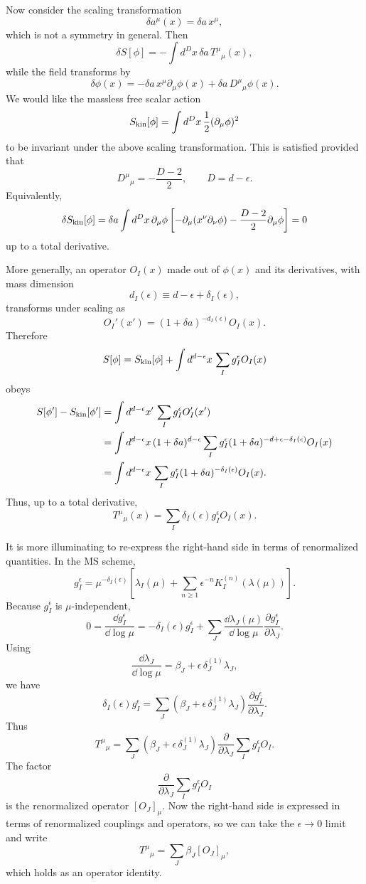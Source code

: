 Now consider the scaling transformation
\[
  \delta a^\mu(x)=\delta a\,x^\mu,
\]
which is not a symmetry in general.  Then
\[
  \delta S[\phi]
  =
  -\int d^Dx\,\delta a\,T^\mu{}_\mu(x),
\]
while the field transforms by
\[
  \delta\phi(x)
  =
  -\delta a\,x^\mu\partial_\mu\phi(x)
  +
  \delta a\,D^\mu{}_\mu\phi(x).
\]
We would like the massless free scalar action
\[
  S_{\rm kin}[\phi]=
  \int d^Dx\,\frac12(\partial_\mu\phi)^2
\]
to be invariant under the above scaling transformation.  This is satisfied
provided that
\[
  D^\mu{}_\mu=-\frac{D-2}{2},
  \qquad D=d-\epsilon.
\]
Equivalently,
\[
  \delta S_{\rm kin}[\phi]
  =
  \delta a\int d^Dx\,\partial_\mu\phi
  \left[
    -\partial_\mu(x^\nu\partial_\nu\phi)
    -\frac{D-2}{2}\partial_\mu\phi
  \right]
  =
  0
\]
up to a total derivative.

More generally, an operator \(O_I(x)\) made out of \(\phi(x)\) and its
derivatives, with mass dimension
\[
  d_I(\epsilon)\equiv d-\epsilon+\delta_I(\epsilon),
\]
transforms under scaling as
\[
  O_I'(x')
  =
  (1+\delta a)^{-d_I(\epsilon)}O_I(x).
\]
Therefore
\[
  S[\phi]
  =
  S_{\rm kin}[\phi]
  +
  \int d^{d-\epsilon}x\,
  \sum_I g_I^\epsilon O_I(x)
\]
obeys
\[
\begin{split}
  S[\phi']-S_{\rm kin}[\phi']
  &=
  \int d^{d-\epsilon}x'\,
  \sum_I g_I^\epsilon O_I'(x')
\\
  &=
  \int d^{d-\epsilon}x\,
  (1+\delta a)^{d-\epsilon}
  \sum_I
  g_I^\epsilon
  (1+\delta a)^{-d+\epsilon-\delta_I(\epsilon)}
  O_I(x)
\\
  &=
  \int d^{d-\epsilon}x\,
  \sum_I
  g_I^\epsilon
  (1+\delta a)^{-\delta_I(\epsilon)}
  O_I(x).
\end{split}
\]
Thus, up to a total derivative,
\[
  T^\mu{}_\mu(x)
  =
  \sum_I\delta_I(\epsilon)g_I^\epsilon O_I(x).
\]

It is more illuminating to re-express the right-hand side in terms of
renormalized quantities.  In the MS scheme,
\[
  g_I^\epsilon
  =
  \mu^{-\delta_I(\epsilon)}
  \left[
    \lambda_I(\mu)
    +
    \sum_{n\geq1}\epsilon^{-n}K_I^{(n)}(\lambda(\mu))
  \right].
\]
Because \(g_I^\epsilon\) is \(\mu\)-independent,
\[
  0
  =
  \frac{\dd g_I^\epsilon}{\dd\log\mu}
  =
  -\delta_I(\epsilon)g_I^\epsilon
  +
  \sum_J
  \frac{\dd\lambda_J(\mu)}{\dd\log\mu}
  \frac{\partial g_I^\epsilon}{\partial\lambda_J}.
\]
Using
\[
  \frac{\dd\lambda_J}{\dd\log\mu}
  =
  \beta_J+\epsilon\,\delta_J^{(1)}\lambda_J,
\]
we have
\[
  \delta_I(\epsilon)g_I^\epsilon
  =
  \sum_J
  \left(\beta_J+\epsilon\,\delta_J^{(1)}\lambda_J\right)
  \frac{\partial g_I^\epsilon}{\partial\lambda_J}.
\]
Thus
\[
  T^\mu{}_\mu
  =
  \sum_J
  \left(\beta_J+\epsilon\,\delta_J^{(1)}\lambda_J\right)
  \frac{\partial}{\partial\lambda_J}
  \sum_I g_I^\epsilon O_I.
\]
The factor
\[
  \frac{\partial}{\partial\lambda_J}
  \sum_I g_I^\epsilon O_I
\]
is the renormalized operator \([O_J]_\mu\).  Now the right-hand side is
expressed in terms of renormalized couplings and operators, so we can take
the \(\epsilon\to0\) limit and write
\[
  T^\mu{}_\mu
  =
  \sum_J\beta_J[O_J]_\mu,
\]
which holds as an operator identity.

